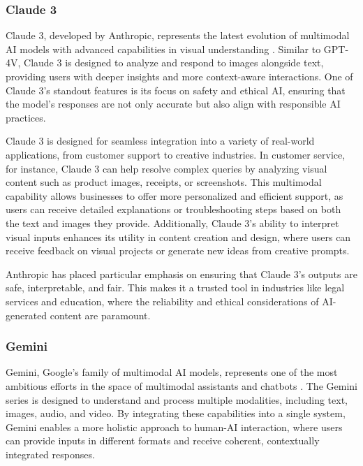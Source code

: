 \subsubsection{Claude 3}

Claude 3, developed by Anthropic, represents the latest evolution of multimodal AI models with advanced capabilities in visual understanding \cite{anthropic2023claude}. 
Similar to GPT-4V, Claude 3 is designed to analyze and respond to images alongside text, providing users with deeper insights and more context-aware interactions. 
One of Claude 3's standout features is its focus on safety and ethical AI, ensuring that the model's responses are not only accurate but also align with responsible AI practices.

Claude 3 is designed for seamless integration into a variety of real-world applications, from customer support to creative industries. 
In customer service, for instance, Claude 3 can help resolve complex queries by analyzing visual content such as product images, receipts, or screenshots. 
This multimodal capability allows businesses to offer more personalized and efficient support, as users can receive detailed explanations or troubleshooting steps based on both the text and images they provide. 
Additionally, Claude 3's ability to interpret visual inputs enhances its utility in content creation and design, where users can receive feedback on visual projects or generate new ideas from creative prompts.

Anthropic has placed particular emphasis on ensuring that Claude 3's outputs are safe, interpretable, and fair. 
This makes it a trusted tool in industries like legal services and education, where the reliability and ethical considerations of AI-generated content are paramount.

\subsubsection{Gemini}

Gemini, Google's family of multimodal AI models, represents one of the most ambitious efforts in the space of multimodal assistants and chatbots \cite{google2023gemini}. 
The Gemini series is designed to understand and process multiple modalities, including text, images, audio, and video. 
By integrating these capabilities into a single system, Gemini enables a more holistic approach to human-AI interaction, where users can provide inputs in different formats and receive coherent, contextually integrated responses.

